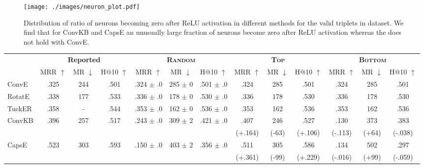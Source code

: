 \documentclass[11pt,a4paper]{article}
\begin{document}
\begin{figure}[t]
	\centering
	\texttt{[image: ./images/neuron\_plot.pdf]}
	\caption{\label{fig:neuron_plot}Distribution of ratio of neurons becoming zero after ReLU activation in different methods for the valid triplets in \datafb{} dataset. We find that for ConvKB and CapsE an unusually large fraction of neurons become zero after ReLU activation whereas the does not hold with ConvE. 
}
\end{figure}

\setlength{\tabcolsep}{3.0pt}

\begin{table*}[t]
	\small
	\centering
	\begin{tabular}{lccc|ccc|ccc|ccc}
		\toprule
		& \multicolumn{3}{c}{\textbf{Reported}} & \multicolumn{3}{c}{\textbf{\textsc{Random}}} & \multicolumn{3}{c}{\textbf{\textsc{Top}}} & \multicolumn{3}{c}{\textbf{\textsc{Bottom}}} \\ 
		\cmidrule(r){2-4}  \cmidrule(r){5-7} \cmidrule(r){8-10} \cmidrule(r){11-13}
		& MRR $\uparrow$ & MR $\downarrow$ & H@10 $\uparrow$ & MRR  $\uparrow$ & MR $\downarrow$ & H@10 $\uparrow$ & MRR $\uparrow$ & MR $\downarrow$ & H@10 $\uparrow$ & MRR $\uparrow$ & MR $\downarrow$ & H@10 $\uparrow$ \\
		\midrule
ConvE		& .325 & 244 & .501 	& .324 $\pm$ .0 & 285	$\pm$ 0 & .501 $\pm$ .0& .324	& 285 & .501	& .324 &	285	& .501 \\
		RotatE		& .338 & 177 & .533 	& .336 $\pm$ .0 & 178 $\pm$ 0 & .530 $\pm$ .0	& .336 & 178 & .530& .336 & 178 & .530 \\ 
		TuckER		& .358 & -   & .544 	& .353 $\pm$ .0	& 162 $\pm$ 0	& .536 $\pm$ .0	& .353	& 162	& .536 & .353	& 162	& .536 \\
		\midrule
		\midrule
		\multirow{2}{*}{ConvKB}		& \multirow{2}{*}{.396} & \multirow{2}{*}{257} & \multirow{2}{*}{.517} 	& \multirow{2}{*}{.243 $\pm$ .0}	& \multirow{2}{*}{309 $\pm$ 2}	& \multirow{2}{*}{.421 $\pm$ .0} & .407	& 246	& .527 & .130	& 373	& .383 \\
		& & & & & & & (+.164) & (-63)& (+.106) & (-.113) & (+64) & (-.038)\\
		\midrule
		\multirow{2}{*}{CapsE}		& \multirow{2}{*}{.523} & \multirow{2}{*}{303} & \multirow{2}{*}{.593} 	& \multirow{2}{*}{.150 $\pm$ .0} & \multirow{2}{*}{403 $\pm$ 2} & \multirow{2}{*}{.356 $\pm$ .0} & .511& 	305	& .586 & .134	& 502	& .297 \\
		& & & & & & & (+.361) & (-99) & (+.229) & (-.016) & (+99) & (-.059)\\

\end{tabular}
\end{table*}
\end{document}
